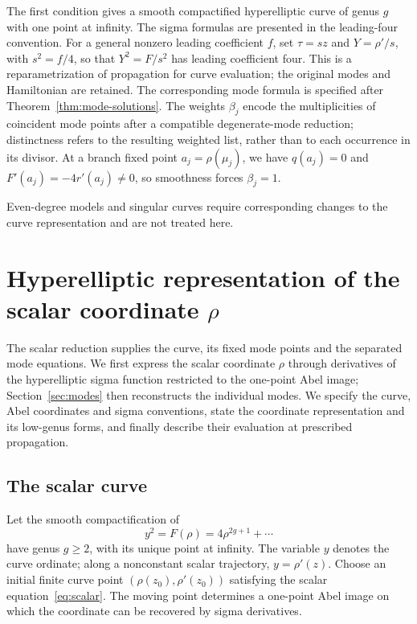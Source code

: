 \documentclass[11pt]{article}
\begin{document}
The first condition gives a smooth compactified hyperelliptic curve of genus $g$ with one point at infinity. The sigma formulas are presented in the leading-four convention. For a general nonzero leading coefficient $f$, set $\tau=sz$ and $Y=\rho'/s$, with $s^2=f/4$, so that $Y^2=F/s^2$ has leading coefficient four. This is a reparametrization of propagation for curve evaluation; the original modes and Hamiltonian are retained. The corresponding mode formula is specified after Theorem~\ref{thm:mode-solutions}. The weights $\beta_j$ encode the multiplicities of coincident mode points after a compatible degenerate-mode reduction; distinctness refers to the resulting weighted list, rather than to each occurrence in its divisor. At a branch fixed point $a_j=\rho(\mu_j)$, we have $q(a_j)=0$ and $F'(a_j)=-4r'(a_j)\ne0$, so smoothness forces $\beta_j=1$.

Even-degree models and singular curves require corresponding changes to the curve representation and are not treated here.

\section{Hyperelliptic representation of the scalar coordinate \texorpdfstring{$\rho$}{rho}}\label{sec:scalar}

The scalar reduction supplies the curve, its fixed mode points and the separated mode equations. We first express the scalar coordinate $\rho$ through derivatives of the hyperelliptic sigma function restricted to the one-point Abel image; Section~\ref{sec:modes} then reconstructs the individual modes. We specify the curve, Abel coordinates and sigma conventions, state the coordinate representation and its low-genus forms, and finally describe their evaluation at prescribed propagation.

\subsection{The scalar curve}

Let the smooth compactification of
\begin{equation}\label{eq:curve}
y^2=F(\rho)=4\rho^{2g+1}+\cdots
\end{equation}
have genus $g\ge2$, with its unique point at infinity. The variable $y$ denotes the curve ordinate; along a nonconstant scalar trajectory, $y=\rho'(z)$. Choose an initial finite curve point $(\rho(z_0),\rho'(z_0))$ satisfying the scalar equation~\eqref{eq:scalar}. The moving point determines a one-point Abel image on which the coordinate can be recovered by sigma derivatives.
\end{document}
